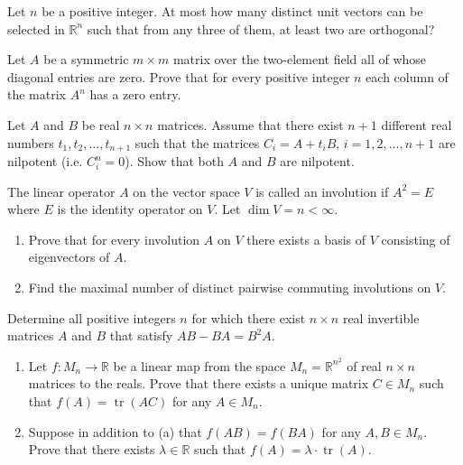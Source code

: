 \documentclass[12pt]{article}
\begin{document}
\begin{problem}
Let $n$ be a positive integer. At most how many distinct unit vectors can be selected in $\mathbb{R}^n$ such that from any three of them, at least two are orthogonal?
\end{problem}

\begin{problem}
Let $A$ be a symmetric $m\times m$ matrix over the two-element field all of whose diagonal entries are zero. Prove that for every positive integer $n$ each column of the matrix $A^n$ has a zero entry.
\end{problem}

\begin{problem}
Let $A$ and $B$ be real $n\times n$ matrices. Assume that there exist $n+1$ different real numbers $t_1,t_2,\dots,t_{n+1}$ such that the matrices $C_i=A+t_iB$, $i=1,2,\dots,n+1$ are nilpotent (i.e. $C_i^n=0$). Show that both $A$ and $B$ are nilpotent.
\end{problem}

\begin{problem}
The linear operator $A$ on the vector space $V$ is called an involution if $A^2=E$ where $E$ is the identity operator on $V$. Let $\dim V = n<\infty$.
\begin{enumerate}[label=(\roman*)]
\item Prove that for every involution $A$ on $V$ there exists a basis of $V$ consisting of eigenvectors of $A$.
\item Find the maximal number of distinct pairwise commuting involutions on $V$.
\end{enumerate}
\end{problem}

\begin{problem}
Determine all positive integers $n$ for which there exist $n\times n$ real invertible matrices $A$ and $B$ that satisfy $AB-BA = B^2A$.
\end{problem}

\begin{problem}
\begin{enumerate}[label=(\alph*)]
\item Let $f:M_n\to\mathbb{R}$ be a linear map from the space $M_n=\mathbb{R}^{n^2}$ of real $n\times n$ matrices to the reals. Prove that there exists a unique matrix $C\in M_n$ such that $f(A)=\operatorname{tr}(AC)$ for any $A\in M_n$.
\item Suppose in addition to (a) that $f(AB)=f(BA)$ for any $A,B\in M_n$. Prove that there exists $\lambda\in\mathbb{R}$ such that $f(A)=\lambda\cdot\operatorname{tr}(A)$.
\end{enumerate}
\end{problem}
\end{document}

